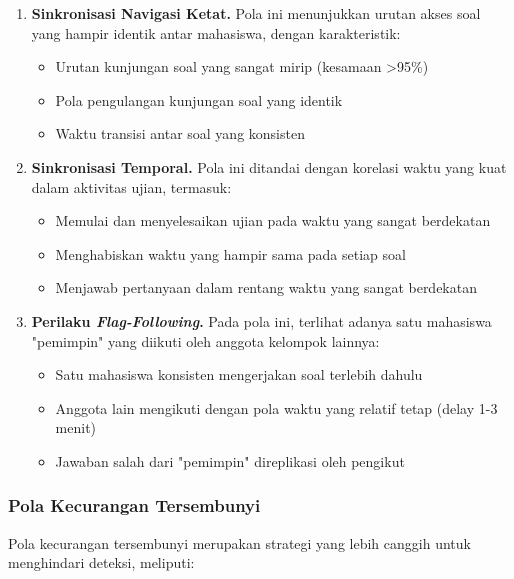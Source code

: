 \begin{enumerate}
    \item \textbf{Sinkronisasi Navigasi Ketat.} Pola ini menunjukkan urutan akses soal yang hampir identik antar mahasiswa, dengan karakteristik:
    \begin{itemize}
        \item Urutan kunjungan soal yang sangat mirip (kesamaan >95\%)
        \item Pola pengulangan kunjungan soal yang identik
        \item Waktu transisi antar soal yang konsisten
    \end{itemize}

    \item \textbf{Sinkronisasi Temporal.} Pola ini ditandai dengan korelasi waktu yang kuat dalam aktivitas ujian, termasuk:
    \begin{itemize}
        \item Memulai dan menyelesaikan ujian pada waktu yang sangat berdekatan
        \item Menghabiskan waktu yang hampir sama pada setiap soal
        \item Menjawab pertanyaan dalam rentang waktu yang sangat berdekatan
    \end{itemize}

    \item \textbf{Perilaku \textit{Flag-Following}.} Pada pola ini, terlihat adanya satu mahasiswa "pemimpin" yang diikuti oleh anggota kelompok lainnya:
    \begin{itemize}
        \item Satu mahasiswa konsisten mengerjakan soal terlebih dahulu
        \item Anggota lain mengikuti dengan pola waktu yang relatif tetap (delay 1-3 menit)
        \item Jawaban salah dari "pemimpin" direplikasi oleh pengikut
    \end{itemize}
\end{enumerate}

\subsubsection{Pola Kecurangan Tersembunyi}

Pola kecurangan tersembunyi merupakan strategi yang lebih canggih untuk menghindari deteksi, meliputi:

